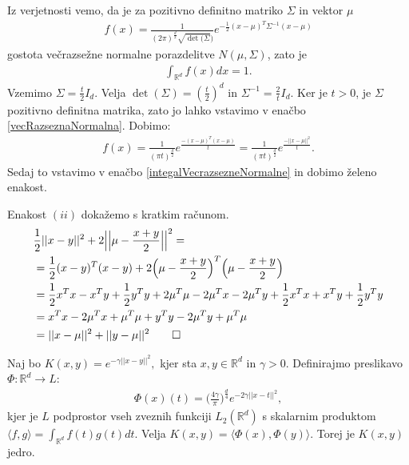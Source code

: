 \documentclass[mat1]{fmfdelo}
\newcommand{\R}{\mathbb R}
\begin{document}
\begin{dokaz}
	Iz verjetnosti vemo, da je za pozitivno definitno matriko $\Sigma$ in vektor $\mu$
	\begin{align}
	\label{vecRazseznaNormalna}
	f(x) = \frac{1}{(2\pi)^\frac{d}{2}\sqrt{\det(\Sigma})}e^{-\frac{1}{2}(x-\mu)^T\Sigma^{-1}(x-\mu)} 
	\end{align}
	gostota večrazsežne normalne porazdelitve $N(\mu, \Sigma)$, zato je 
	\begin{align}
	\label{integalVecrazsezneNormalne}
	\int_{\R^d}f(x)dx = 1.
	\end{align}
	Vzemimo $\Sigma =  \frac{t}{2}I_d$. Velja $\det(\Sigma) = (\frac{t}{2})^d$ in $\Sigma^{-1} = \frac{2}{t}I_d$. Ker je $t > 0$, je $\Sigma$ pozitivno definitna matrika, zato jo lahko vstavimo v enačbo \eqref{vecRazseznaNormalna}. Dobimo:
	\begin{align*}
	f(x) = \frac{1}{(\pi t)^\frac{d}{2}}e^{\frac{-(x-\mu)^T(x-\mu)}{t}} = \frac{1}{(\pi t)^\frac{d}{2}}e^{\frac{-||x-\mu||^2}{t}}.
	\end{align*}
	Sedaj to vstavimo v enačbo \eqref{integalVecrazsezneNormalne} in dobimo želeno enakost. 
	
	
	Enakost $(ii)$ dokažemo s kratkim računom. 
	\begin{align*}
		&\frac{1}{2}||x-y||^2+ 2\Big|\Big|\mu - \frac{x+y}{2}\Big|\Big|^2= \\
		&= \frac{1}{2}(x-y)^T(x-y) + 2\Big(\mu - \frac{x+y}{2}\Big)^T\Big(\mu - \frac{x+y}{2}\Big) \\
		&= \frac{1}{2}x^Tx- x^Ty+\frac{1}{2}y^Ty+2\mu^T\mu-2\mu^Tx -2\mu^Ty+\frac{1}{2}x^Tx+x^Ty+\frac{1}{2}y^Ty\\
		&= x^Tx  - 2\mu^Tx + \mu^T\mu + y^Ty- 2\mu^Ty + \mu^T\mu\\
		&= ||x-\mu||^2 + ||y-\mu||^2 \qedhere
	\end{align*}
\end{dokaz}

\begin{trditev}
	Naj bo $ K(x, y) = e^{-\gamma||x-y||^2}, $ kjer sta $x, y \in \R^d$ in $\gamma > 0$. Definirajmo preslikavo $\Phi: \R^d \to L$:
	\begin{align*}
	\Phi(x)(t) = \Big(\frac{4\gamma}{\pi}\Big)^\frac{d}{4}e^{-2\gamma||x-t||^2}, 
	\end{align*} 
	kjer je $L$ podprostor vseh zveznih funkciji $ L_2(\R^d)$ s skalarnim produktom $\langle f, g    \rangle = \int_{\R^d}f(t)g(t)dt.$ Velja $ K(x, y) = \langle \Phi(x), \Phi(y) \rangle $. Torej je 	$K(x, y)$ jedro.
\end{trditev}
\end{document}
